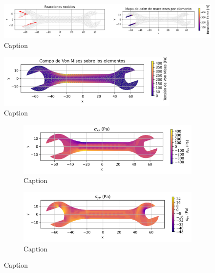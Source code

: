 \documentclass{article}  %
\begin{document}
\begin{figure}[H]
  \centering
  \includegraphics[width=1\textwidth]{GRAFICOS/Case a_deformada_reacciones.png}
  \caption{Caption}
  \label{fig:principal}
\end{figure}

\begin{figure}[H]
  \centering
  \includegraphics[width=0.8\textwidth]{GRAFICOS/Case a_von_mises.png}
  \caption{Caption}
  \label{fig:principal}
\end{figure}

\begin{figure}[H]
  \centering
  \begin{subfigure}[t]{0.49\textwidth}
    \centering
    \includegraphics[width=\textwidth]{GRAFICOS/Case a - sigma_xx.png}
    \caption{Caption}
    \label{fig:deformada_reacciones}
  \end{subfigure}
  \hfill
  \begin{subfigure}[t]{0.49\textwidth}
    \centering
    \includegraphics[width=\textwidth]{GRAFICOS/Case a - sigma_yy.png}
    \caption{Caption}
    \label{fig:von_mises}
  \end{subfigure}
  \caption{Caption}
  \label{fig:analisis_estructural}
\end{figure}
\end{document}
